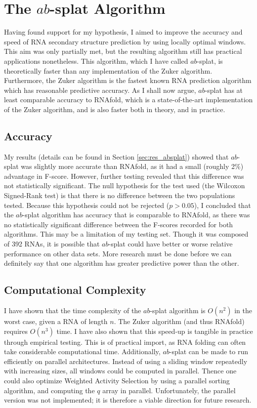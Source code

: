 \documentclass{cshonours}
\begin{document}
\section{The $ab$-splat Algorithm}

Having found support for my hypothesis, I aimed to improve the accuracy and speed of RNA secondary structure prediction by using locally optimal windows. This aim was only partially met, but the resulting algorithm still has practical applications nonetheless. This algorithm, which I have called $ab$-splat, is theoretically faster than any implementation of the Zuker algorithm. Furthermore, the Zuker algorithm is the fastest known RNA prediction algorithm which has reasonable predictive accuracy. As I shall now argue, $ab$-splat has at least comparable accuracy to RNAfold, which is a state-of-the-art implementation of the Zuker algorithm, and is also faster both in theory, and in practice.

\subsection{Accuracy}

My results (details can be found in Section \ref{sec:res_absplat}) showed that $ab$-splat was slightly more accurate than RNAfold, as it had a small (roughly 2\%) advantage in F-score. However, further testing revealed that this difference was not statistically significant. The null hypothesis for the test used (the Wilcoxon Signed-Rank test) is that there is no difference between the two populations tested. Because this hypothesis could not be rejected ($p > 0.05$), I concluded that the $ab$-splat algorithm has accuracy that is comparable to RNAfold, as there was no statistically significant difference between the F-scores recorded for both algorithms. This may be a limitation of my testing set. Though it was composed of 392 RNAs, it is possible that $ab$-splat could have better or worse relative performance on other data sets. More research must be done before we can definitely say that one algorithm has greater predictive power than the other.

\subsection{Computational Complexity}

I have shown that the time complexity of the $ab$-splat algorithm is $O(n^2)$ in the worst case, given a RNA of length $n$. The Zuker algorithm (and thus RNAfold) requires $O(n^3)$ time. I have also shown that this speed-up is tangible in practice through empirical testing. This is of practical import, as RNA folding can often take considerable computational time. Additionally, $ab$-splat can be made to run efficiently on parallel architectures. Instead of using a sliding window repeatedly with increasing sizes, all windows could be computed in parallel. Thence one could also optimize Weighted Activity Selection by using a parallel sorting algorithm, and computing the $q$ array in parallel. Unfortunately, the parallel version was not implemented; it is therefore a viable direction for future research.
\end{document}

